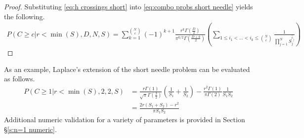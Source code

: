 \documentclass{article}
\newtheorem{proposition}{Proposition}
\begin{document}
\begin{proof}
	Substituting \ref{eq:h crossings short} into \ref{eq:combo probs short needle} yields the following.
	\begin{gather}
		P(C\ge c|r<\min(S), D, N, S) = \sum_{k=1}^{N\choose c} (-1)^{k+1} \frac{r^k\Gamma(\frac{D}{2})}{\pi^{k/2}\Gamma(\frac{D+k}{2})} \left(\sum_{1\le i_1 < \hdots < i_k \le {N\choose c}}\frac{1}{\prod_{j=1}^N S_j^{\hat{\bar{c}}_j}} \right)
	\end{gather}
\end{proof}

As an example, Laplace's extension of the short needle problem can be evaluated as follows.
\begin{align}
	P(C \ge 1|r<\min(S), 2, 2, S) &= \frac{r\Gamma(1)}{\sqrt{\pi}\Gamma(\frac{3}{2})}\left( \frac{1}{S_1}+\frac{1}{S_2}\right) - \frac{r^2\Gamma(1)}{\pi \Gamma(2)} \frac{1}{S_1S_2}\\
	&= \frac{2r(S_1+S_2)-r^2}{\pi S_1S_2}
\end{align}
Additional numeric validation for a variety of parameters is provided in Section \S\ref{s:n=1 numeric}.


	
\end{document}
